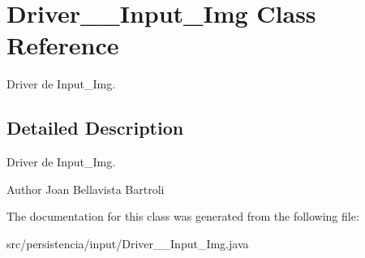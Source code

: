 \hypertarget{classDriver____Input__Img}{}\section{Driver\+\_\+\+\_\+\+Input\+\_\+\+Img Class Reference}
\label{classDriver____Input__Img}


Driver de Input\+\_\+\+Img.  




\subsection{Detailed Description}
Driver de Input\+\_\+\+Img. 

\begin{DoxyAuthor}{Author}
Joan Bellavista Bartroli 
\end{DoxyAuthor}


The documentation for this class was generated from the following file\+:\begin{DoxyCompactItemize}
\item 
src/persistencia/input/Driver\+\_\+\+\_\+\+Input\+\_\+\+Img.\+java\end{DoxyCompactItemize}
